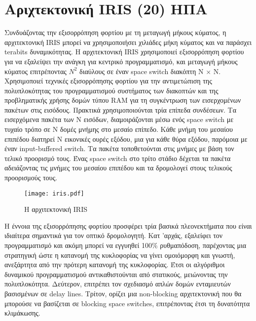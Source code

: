 ﻿
\section{Αριχτεκτονική IRIS (20) ΗΠΑ}


Συνδυάζοντας την εξισορρόπηση φορτίου με τη μεταγωγή μήκους κύματος, η
αρχιτεκτονική IRIS μπορεί να χρησιμοποιήσει χιλιάδες μήκη κύματος και
να παράσχει terabits δυναμικότητας. Η αρχιτεκτονική IRIS χρησιμοποιεί
εξισορρόπηση φορτίου για να εξαλείψει την ανάγκη για κεντρικό
προγραμματισμό, και μεταγωγή μήκους κύματος επιτρέποντας $N^2$
διαύλους σε έναν space switch διακόπτη N × N. Xρησιμοποιεί τεχνικές
εξισορρόπησης φορτίου για την αντιμετώπιση της πολυπλοκότητας του
προγραμματισμού συστήματος των διακοπτών και της προβληματικής χρήσης
δομών τύπου RAM για τη συγκέντρωση των εισερχομένων πακέτων στις
εισόδους. Πρακτικά χρησιμοποιούνται τρία επίπεδα συνδέσεων. Τα
εισερχόμενα πακέτα των N εισόδων, διαμοιράζονται μέσω ενός space
switch με τυχαίο τρόπο σε Ν δομές μνήμης στο μεσαίο επίπεδο. Κάθε
μνήμη του μεσαίου επιπέδου διατηρεί Ν εικονικές ουρές εξόδου, μια για
κάθε θύρα εξόδου, παρόμοια με έναν input-buffered switch. Τα πακέτα
τοποθετούνται στις μνήμες με βάση τον τελικό προορισμό τους. Ένας
space switch στο τρίτο στάδιο δέχεται τα πακέτα αδειάζοντας τις μνήμες
του μεσαίου επιπέδου και τα δρομολογεί στους τελικούς προορισμούς
τους.

\begin{figure}[h]
  \centering
  \texttt{[image: iris.pdf]}
  \caption{Η αρχιτεκτονική IRIS}
  \label{fig:iris}
\end{figure}

H έννοια της εξισορρόπησης φορτίου προσφέρει τρία βασικά πλεονεκτήματα
που είναι ιδιαίτερα σημαντικά για τον οπτικό δρομολογητή. Κατ 'αρχάς,
εξαλείφει τον προγραμματισμό και ακόμη μπορεί να εγγυηθεί 100\%
ρυθμαπόδοση, παρέχοντας μια στρατηγική ώστε η κατανομή της κυκλοφορίας
να γίνει ομοιόμορφη και γνωστή, ανεξάρτητα από την πρότερη κατανομή
της κυκλοφορίας. Έτσι οι αλγόριθμοι δυναμικού προγραμματισμού
αντικαθιστούνται από στατικούς, μειώνοντας την
πολυπλοκότητα. Δεύτερον, επιτρέπει τον σχεδιασμό απλών δομών ενταμιευτών
βασισμένων σε delay lines. Τρίτον, ορίζει μια non-blocking
αρχιτεκτονική που θα μπορούσε να βασίζεται σε blocking space switches,
επιτρέποντας έτσι τη δυνατότητα κλιμάκωσης.

